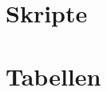 \appendix


\chapter{Skripte}
\label{ch:skripte}
%	
%	
%	


%	
%	

\chapter{Tabellen}
\label{ch:tabellen}




\clearpage